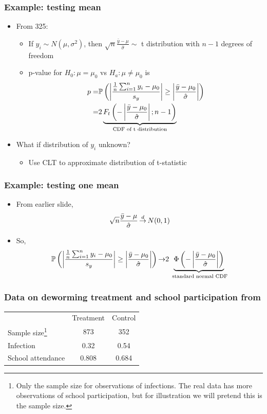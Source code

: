 \begin{frame}[allowframebreaks]
  \frametitle{Example: testing mean}
  \begin{itemize}
  \item From 325: 
    \begin{itemize}
    \item If $y_i \sim N(\mu,\sigma^2)$, then $\sqrt{n}
      \frac{\bar{y} - \mu}{\hat{\sigma}} \sim$ t distribution with
      $n-1$ degrees of freedom
    \item p-value for $H_0: \mu = \mu_0$ vs $H_a: \mu \neq \mu_0$ is 
      \begin{align*} p = & {\mathbb{P}}\left( \left\vert {\frac{\frac{1}{n} \sum_{i=1}^n y_i -
              \mu_0}{ s_y}} \right\vert \geq
          \left\vert {\frac{\bar{y} - \mu_0}{\hat{\sigma}} } \right\vert \right) \\ 
        = & 2 
        \underbrace{F_t\left(-\left\vert {\frac{\bar{y} - \mu_0}{\hat{\sigma}}} \right\vert;n-1\right)
        }_{\text{CDF of t distribution}} 
      \end{align*}
    \end{itemize}
  \item What if distribution of $y_i$ unknown?
    \begin{itemize}
    \item Use CLT to approximate distribution of t-statistic
    \end{itemize}
  \end{itemize}
\end{frame}

\begin{frame}
  \frametitle{Example: testing one mean}
  \begin{itemize}
  \item From earlier slide,
    \[ \sqrt{n} \frac{\bar{y} - \mu}{\hat{\sigma}} \indist N(0,1) \]
  \item So,
    \[ {\mathbb{P}}\left( \left\vert {\frac{\frac{1}{n} \sum_{i=1}^n y_i -
          \mu_0}{ s_y}} \right\vert \geq
      \left\vert {\frac{\bar{y} - \mu_0}{\hat{\sigma}} } \right\vert \right) {\rightarrow}
    2\underbrace{\Phi\left(-\left\vert {\frac{\bar{y} -
            \mu_0}{\hat{\sigma}}} \right\vert\right)}_{\text{ standard normal
        CDF}} 
    \]
  \end{itemize}
\end{frame}

\begin{frame}
  \frametitle{Data on deworming treatment and school participation
    from \citet{miguel2003}}

  \begin{tabular}{lcc}
    & Treatment & Control \\
    Sample size\footnote{Only the sample size for observations
      of infections. The real data has more observations of school
      participation, but for illustration we will pretend this is the
      sample size.} & 873 & 352 \\
    Infection & 0.32 & 0.54 \\
    School attendance & 0.808 & 0.684 
  \end{tabular}  

\end{frame}
  
